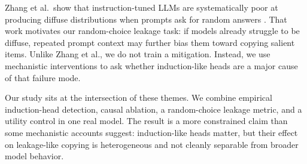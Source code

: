  Zhang et al.\ show that instruction-tuned LLMs are systematically poor at producing diffuse distributions when prompts ask for random answers \cite{zhang2024diffuse}. That work motivates our random-choice leakage task: if models already struggle to be diffuse, repeated prompt context may further bias them toward copying salient items. Unlike Zhang et al., we do not train a mitigation. Instead, we use mechanistic interventions to ask whether induction-like heads are a major cause of that failure mode.

 Our study sits at the intersection of these themes. We combine empirical induction-head detection, causal ablation, a random-choice leakage metric, and a utility control in one real model. The result is a more constrained claim than some mechanistic accounts suggest: induction-like heads matter, but their effect on leakage-like copying is heterogeneous and not cleanly separable from broader model behavior.
